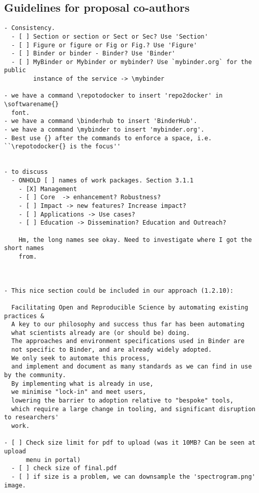 \documentclass[
  11pt,
  deliverables,
  longtasklabels,
  numericcites,
  noworkareas,
  svgnames,
  \classoptions
]{euproposal}       %
\newcommand{\softwarename}[1]{\texttt{#1}}
\newcommand{\repotodocker}{\softwarename{repo2docker}}
\newcommand{\binderhub}{\softwarename{BinderHub}}
\newcommand{\mybinder}{mybinder.org}   %
\begin{document}
\setlength{\headheight}{13.6pt}

\begin{draft}

\section*{Guidelines for proposal co-authors}

\begin{verbatim}
- Consistency.
  - [ ] Section or section or Sect or Sec? Use 'Section'
  - [ ] Figure or figure or Fig or Fig.? Use 'Figure'
  - [ ] Binder or binder - Binder? Use 'Binder'
  - [ ] MyBinder or Mybinder or mybinder? Use `mybinder.org` for the public
        instance of the service -> \mybinder

- we have a command \repotodocker to insert 'repo2docker' in \softwarename{}
  font.
- we have a command \binderhub to insert 'BinderHub'.
- we have a command \mybinder to insert 'mybinder.org'.
- Best use {} after the commands to enforce a space, i.e. ``\repotodocker{} is the focus''


- to discuss
  - ONHOLD [ ] names of work packages. Section 3.1.1
    - [X] Management
    - [ ] Core  -> enhancement? Robustness?
    - [ ] Impact -> new features? Increase impact?
    - [ ] Applications -> Use cases?
    - [ ] Education -> Dissemination? Education and Outreach?

    Hm, the long names see okay. Need to investigate where I got the short names
    from.



- This nice section could be included in our approach (1.2.10):

  Facilitating Open and Reproducible Science by automating existing practices &
  A key to our philosophy and success thus far has been automating
  what scientists already are (or should be) doing.
  The approaches and environment specifications used in Binder are
  not specific to Binder, and are already widely adopted.
  We only seek to automate this process,
  and implement and document as many standards as we can find in use by the community.
  By implementing what is already in use,
  we minimise "lock-in" and meet users,
  lowering the barrier to adoption relative to "bespoke" tools,
  which require a large change in tooling, and significant disruption to researchers'
  work.

- [ ] Check size limit for pdf to upload (was it 10MB? Can be seen at upload
      menu in portal)
  - [ ] check size of final.pdf
  - [ ] if size is a problem, we can downsample the 'spectrogram.png' image.


\end{verbatim}
\end{draft}
\end{document}
